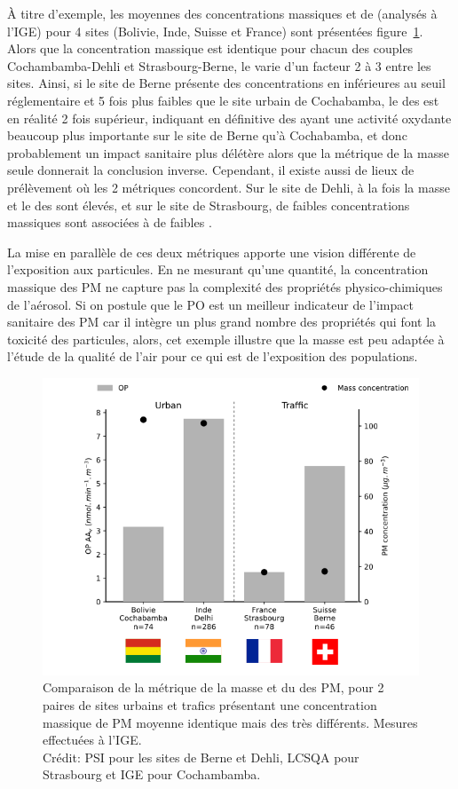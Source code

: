 À titre d'exemple, les moyennes des concentrations massiques et de \POAAv{} (analysés à
l'IGE) pour 4 sites (Bolivie,
Inde, Suisse et France) sont présentées figure~\ref{fig:OPAAv_4sites}.
Alors que la concentration massique est identique pour chacun des couples
Cochambamba-Dehli et Strasbourg-Berne, le \POAAv{} varie d'un facteur 2 à 3 entre les
sites.  Ainsi, si
le site de Berne présente des concentrations en \PMdix{} inférieures au seuil réglementaire
et 5 fois plus faibles que le site urbain de Cochabamba, le \POAAv{} des \PMdix{} est
en réalité 2 fois supérieur, indiquant en définitive des \PMdix{} ayant une activité
oxydante beaucoup plus importante sur le site de Berne qu'à Cochabamba, et donc
probablement un impact sanitaire plus délétère alors que la métrique de la masse seule
donnerait la conclusion inverse.
Cependant, il existe aussi de lieux de prélèvement où les 2 métriques concordent. Sur le
site de Dehli, à la fois la masse et le \POAAv{} des \PMdix{} sont élevés, et sur le
site de Strasbourg, de faibles concentrations massiques sont associées à de faibles \POAAv.

La mise en parallèle de ces deux métriques apporte une vision différente de l'exposition
aux particules.
En ne mesurant qu'une quantité, la concentration massique des PM ne capture pas la complexité
des propriétés physico-chimiques de l'aérosol. Si on postule que le PO est
un meilleur indicateur de l'impact sanitaire des PM car il intègre un plus grand 
nombre des propriétés qui font la toxicité des particules, alors, cet exemple illustre
que la masse est peu adaptée à l'étude de la qualité de l'air pour ce qui est de l'exposition 
des populations.


\begin{figure}[ht!]
    \centering
    \includegraphics[width=0.7\linewidth]{figures/chapter04/OPAAv_4sites.png}
    \caption{Comparaison de la métrique de la masse et du \POAAv{} des PM, pour 2 paires
        de sites urbains et trafics présentant une concentration massique de PM
        moyenne identique mais des \POAAv{} très différents. Mesures effectuées à l'IGE.\\
        Crédit: PSI pour les sites de Berne et Dehli, LCSQA pour Strasbourg et IGE pour
        Cochambamba.
    }%
    \label{fig:OPAAv_4sites}
\end{figure}


